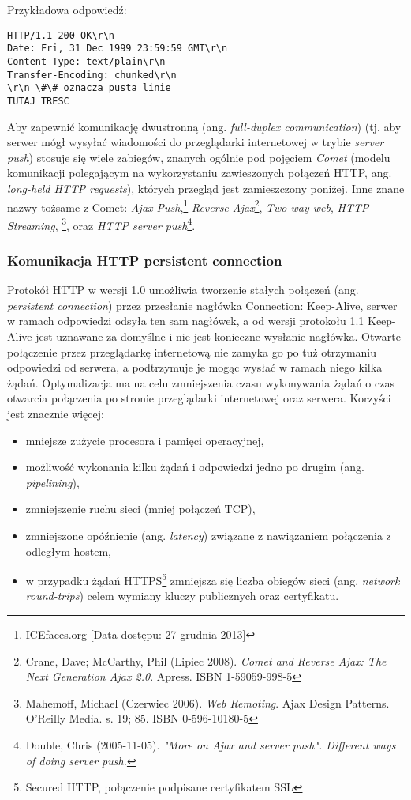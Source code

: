 Przykładowa odpowiedź:
\lstset{language=Octave}
\begin{lstlisting}
HTTP/1.1 200 OK\r\n
Date: Fri, 31 Dec 1999 23:59:59 GMT\r\n
Content-Type: text/plain\r\n
Transfer-Encoding: chunked\r\n
\r\n \#\# oznacza pusta linie
TUTAJ TRESC
\end{lstlisting}

Aby zapewnić komunikację dwustronną (ang. \emph{full-duplex communication}) (tj. aby serwer mógł wysyłać wiadomości do przeglądarki internetowej w trybie \emph{server push}) stosuje się wiele zabiegów, znanych ogólnie pod pojęciem \emph{Comet} (modelu komunikacji polegającym na wykorzystaniu zawieszonych połączeń HTTP, ang. \emph{long-held HTTP requests}), których przegląd jest zamieszczony poniżej. Inne znane nazwy tożsame z Comet: \emph{Ajax Push},\footnote{ICEfaces.org [Data dostępu: 27 grudnia 2013]} \emph{Reverse Ajax}\footnote{Crane, Dave; McCarthy, Phil (Lipiec 2008). \emph{Comet and Reverse Ajax: The Next Generation Ajax 2.0}. Apress. ISBN 1-59059-998-5}, \emph{Two-way-web}, \emph{HTTP Streaming}, \footnote{Mahemoff, Michael (Czerwiec 2006). \emph{Web Remoting}. Ajax Design Patterns. O'Reilly Media. s. 19; 85. ISBN 0-596-10180-5}, oraz \emph{HTTP server push}\footnote{Double, Chris (2005-11-05). \emph{"More on Ajax and server push". Different ways of doing server push.}}.

\subsubsection{Komunikacja HTTP persistent connection}
\label{subsub:http-persistent-connection}

Protokół HTTP w wersji 1.0 umożliwia tworzenie stałych połączeń (ang. \emph{persistent connection}) przez przesłanie nagłówka Connection: Keep-Alive, serwer w ramach odpowiedzi odsyła ten sam nagłówek, a od wersji protokołu 1.1 Keep-Alive jest uznawane za domyślne i nie jest konieczne wysłanie nagłówka. Otwarte połączenie przez przeglądarkę internetową nie zamyka go po tuż otrzymaniu odpowiedzi od serwera, a podtrzymuje je mogąc wysłać w ramach niego kilka żądań. Optymalizacja ma na celu zmniejszenia czasu wykonywania żądań o czas otwarcia połączenia po stronie przeglądarki internetowej oraz serwera. Korzyści jest znacznie więcej:

\begin{itemize}
	\item mniejsze zużycie procesora i pamięci operacyjnej,
	\item możliwość wykonania kilku żądań i odpowiedzi jedno po drugim (ang. \emph{pipelining}),
	\item zmniejszenie ruchu sieci (mniej połączeń TCP),
	\item zmniejszone opóźnienie (ang. \emph{latency}) związane z nawiązaniem połączenia z odległym hostem,
	\item w przypadku żądań HTTPS\footnote{Secured HTTP, połączenie podpisane certyfikatem SSL} zmniejsza się liczba obiegów sieci (ang. \emph{network round-trips}) celem wymiany kluczy publicznych oraz certyfikatu.
\end{itemize}

